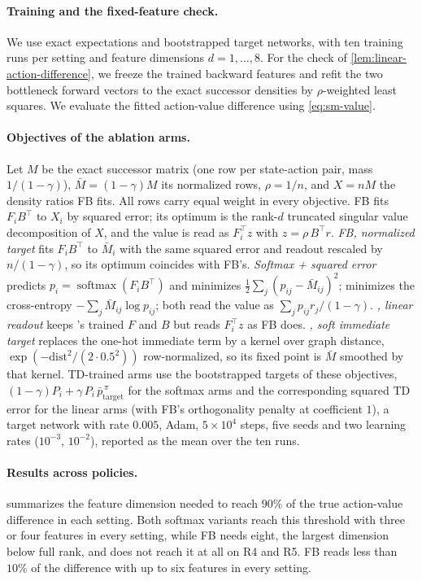\paragraph{Training and the fixed-feature check.}
We use exact expectations and bootstrapped target networks, with ten training runs per setting and feature dimensions $d=1,\ldots,8$.
For the check of \cref{lem:linear-action-difference}, we freeze the trained backward features and refit the two bottleneck forward vectors to the exact successor densities by $\rho$-weighted least squares.
We evaluate the fitted action-value difference using \eqref{eq:sm-value}.

\paragraph{Objectives of the ablation arms.}
Let $M$ be the exact successor matrix (one row per state-action pair, mass $1/(1-\gamma)$), $\bar M=(1-\gamma)M$ its normalized rows, $\rho=1/n$, and $X=nM$ the density ratios FB fits.
All rows carry equal weight in every objective.
FB fits $F_iB^\top$ to $X_i$ by squared error; its optimum is the rank-$d$ truncated singular value decomposition of $X$, and the value is read as $F_i^\top z$ with $z=\rho\,B^\top r$.
\emph{FB, normalized target} fits $F_iB^\top$ to $\bar M_i$ with the same squared error and readout rescaled by $n/(1-\gamma)$, so its optimum coincides with FB's.
\emph{Softmax + squared error} predicts $p_i=\operatorname{softmax}(F_iB^\top)$ and minimizes $\tfrac12\sum_j(p_{ij}-\bar M_{ij})^2$; \name{} minimizes the cross-entropy $-\sum_j\bar M_{ij}\log p_{ij}$; both read the value as $\sum_j p_{ij}r_j/(1-\gamma)$.
\emph{\name{}, linear readout} keeps \name{}'s trained $F$ and $B$ but reads $F_i^\top z$ as FB does.
\emph{\name{}, soft immediate target} replaces the one-hot immediate term by a kernel over graph distance, $\exp(-\mathrm{dist}^2/(2\cdot0.5^2))$ row-normalized, so its fixed point is $\bar M$ smoothed by that kernel.
TD-trained arms use the bootstrapped targets of these objectives, $(1-\gamma)P_i+\gamma\,P_i\,\bar p^{\,\pi}_{\mathrm{target}}$ for the softmax arms and the corresponding squared TD error for the linear arms (with FB's orthogonality penalty at coefficient $1$), a target network with rate $0.005$, Adam, $5\times10^4$ steps, five seeds and two learning rates ($10^{-3}$, $10^{-2}$), reported as the mean over the ten runs.

\paragraph{Results across policies.}
\label{app:bottleneck-family-result}
 summarizes the feature dimension needed to reach $90\%$ of the true action-value difference in each setting.
Both softmax variants reach this threshold with three or four features in every setting, while FB needs eight, the largest dimension below full rank, and does not reach it at all on R4 and R5.
FB reads less than $10\%$ of the difference with up to six features in every setting.

